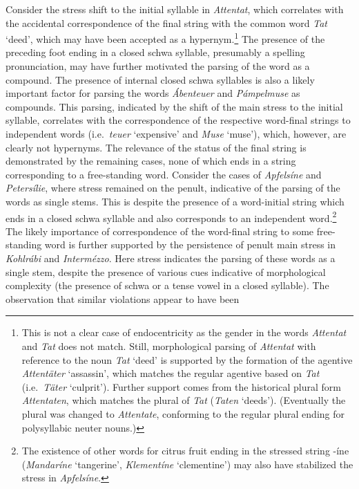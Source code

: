 \documentclass[output=paper
 ,nobabel
 ,draftmode
 ,colorlinks, citecolor=brown
]{langscibook}
\begin{document}
\largerpage
\noindent
Consider the stress shift to the initial syllable in \emph{Attentat}, which correlates with the
accidental correspondence of the final string with the common  word \emph{Tat} `deed', which
may have been accepted as a hypernym.\footnote{This is not a clear case of endocentricity as the
  gender in the words \emph{Attentat} and \emph{Tat} does not match. Still, morphological parsing of
  \emph{Attentat} with reference to the noun \emph{Tat} `deed' is supported by the formation of the
  agentive \emph{Attentäter} `assassin', which matches the regular agentive based on \emph{Tat}
  (i.e.\ \emph{Täter} `culprit'). Further support comes from the historical plural form
  \emph{Attentaten}, which matches the plural of \emph{Tat} (\emph{Taten} `deeds'). (Eventually the
  plural was changed to \emph{Attentate}, conforming to the regular plural ending for polysyllabic
  neuter nouns.)} The presence of the preceding foot ending in a closed schwa syllable, presumably a
spelling pronunciation, may have further motivated the parsing of the word as a compound. The
presence of internal closed schwa syllables is also a likely important factor for parsing the words
\emph{Ábenteuer} and \emph{Pámpelmuse} as compounds. This parsing, indicated by the shift of the
main stress to the initial syllable, correlates with the correspondence of the respective word-final
strings to independent words (i.e.\ \emph{teuer} `expensive' and \emph{Muse} `muse'), which,
however, are clearly not hypernyms. The relevance of the status of the final string is demonstrated
by the remaining cases, none of which ends in a string corresponding to a free-standing
word. Consider the cases of \emph{Apfelsíne} and \emph{Petersílie}, where stress remained on the
penult, indicative of the parsing of the words as single stems. This is despite the presence of a
word-initial string which ends in a closed schwa syllable and also corresponds to an independent
word.\footnote{The existence of other words for citrus fruit ending in the stressed string {-íne}
  (\emph{Mandaríne} `tangerine', \emph{Klementíne} `clementine') may also have stabilized the stress
  in \emph{Apfelsíne}.} The likely importance of correspondence of the word-final string to some
free-standing word is further supported by the persistence of penult main stress in \emph{Kohlrábi}
and \emph{Intermézzo}. Here stress indicates the parsing of these words as a single stem, despite
the presence of various cues indicative of morphological complexity (\eg the presence of schwa or a
tense vowel in a closed syllable). The observation that similar violations appear to have been
\end{document}
